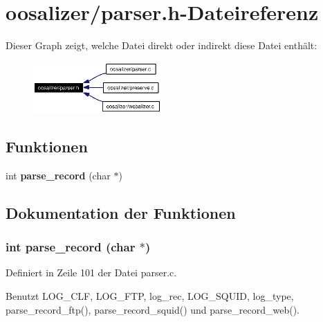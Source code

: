 \section{oosalizer/parser.h-Dateireferenz}
\label{parser_8h}


Dieser Graph zeigt, welche Datei direkt oder indirekt diese Datei enth\"{a}lt:\begin{figure}[H]
\begin{center}
\leavevmode
\includegraphics[width=139pt]{parser_8h__dep__incl}
\end{center}
\end{figure}
\subsection*{Funktionen}
\begin{CompactItemize}
\item 
int {\bf parse\_\-record} (char $\ast$)
\end{CompactItemize}


\subsection{Dokumentation der Funktionen}
\subsubsection{\setlength{\rightskip}{0pt plus 5cm}int parse\_\-record (char $\ast$)}\label{parser_8h_2e298d5e806fc4936bf6b142c0913a31}




Definiert in Zeile 101 der Datei parser.c.

Benutzt LOG\_\-CLF, LOG\_\-FTP, log\_\-rec, LOG\_\-SQUID, log\_\-type, parse\_\-record\_\-ftp(), parse\_\-record\_\-squid() und parse\_\-record\_\-web().